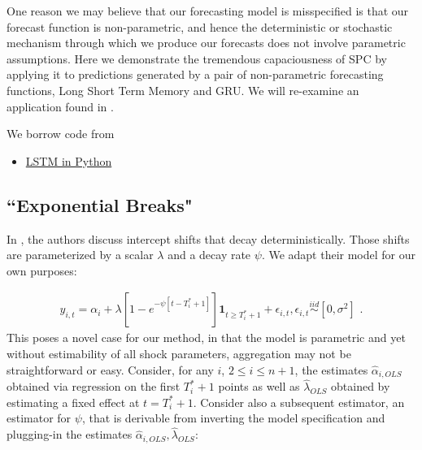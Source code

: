 \documentclass[11pt]{article}
\newcommand{\simiid}{\stackrel{iid}{\sim}} %
\theoremstyle{definition}
\begin{document}
One reason we may believe that our forecasting model is misspecified is that our forecast function is non-parametric, and hence the deterministic or stochastic mechanism through which we produce our forecasts does not involve parametric assumptions.  Here we demonstrate the tremendous capaciousness of SPC by applying it to predictions generated by a pair of non-parametric forecasting functions, Long Short Term Memory and GRU.  We will re-examine an application found in \cite{lin2021minimizing}.

We borrow code from \cite{Brownlee_2022}

\begin{itemize}
  \item \href{https://machinelearningmastery.com/time-series-prediction-lstm-recurrent-neural-networks-python-keras/}{LSTM in Python}
\end{itemize}

\subsection{``Exponential Breaks"}
In \cite{castle2011forecasting}, the authors discuss intercept shifts that decay deterministically.  Those shifts are parameterized by a scalar $\lambda$ and a decay rate $\psi$.  We adapt their model for our own purposes:

\begin{align}
y_{i,t} = \alpha_{i} + \lambda[1 - e^{-\psi[t-T_{i}^{*}+1]}]\textbf{1}_{t\geq T_{i}^{*}+1} + \epsilon_{i,t}, \epsilon_{i,t} \simiid [0,\sigma^{2}] \text{ .}\label{decay_model}
\end{align}
This poses a novel case for our method, in that the model is parametric and yet without estimability of all shock parameters, aggregation may not be straightforward or easy.  Consider, for any $i$, $2 \leq i \leq n+1$, the estimates $\hat\alpha_{i,OLS}$  obtained via regression on the first $T_{i}^{*}+1$ points as well as $\hat\lambda_{OLS}$ obtained by estimating a fixed effect at $t=T_{i}^{*}+1$.  Consider also a subsequent estimator, an estimator for $\psi$, that is derivable from inverting the model specification and plugging-in the estimates  $\hat\alpha_{i,OLS},\hat\lambda_{OLS}$:
\end{document}
